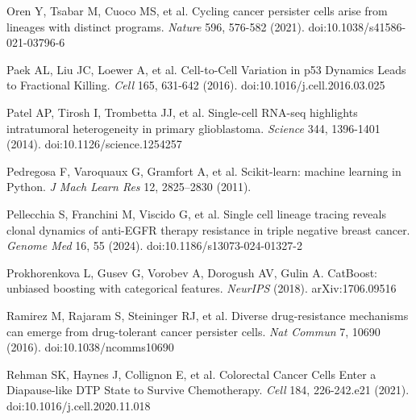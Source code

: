\documentclass[11pt,a4paper]{article}
\begin{document}
\noindent Oren Y, Tsabar M, Cuoco MS, et al. Cycling cancer persister cells arise from lineages with distinct programs. \emph{Nature} 596, 576-582 (2021). doi:10.1038/s41586-021-03796-6 \par\vspace{2pt}

\noindent Paek AL, Liu JC, Loewer A, et al. Cell-to-Cell Variation in p53 Dynamics Leads to Fractional Killing. \emph{Cell} 165, 631-642 (2016). doi:10.1016/j.cell.2016.03.025 \par\vspace{2pt}

\noindent Patel AP, Tirosh I, Trombetta JJ, et al. Single-cell RNA-seq highlights intratumoral heterogeneity in primary glioblastoma. \emph{Science} 344, 1396-1401 (2014). doi:10.1126/science.1254257 \par\vspace{2pt}

\noindent Pedregosa F, Varoquaux G, Gramfort A, et al. Scikit-learn: machine learning in Python. \emph{J Mach Learn Res} 12, 2825--2830 (2011).\par\vspace{2pt}

\noindent Pellecchia S, Franchini M, Viscido G, et al. Single cell lineage tracing reveals clonal dynamics of anti-EGFR therapy resistance in triple negative breast cancer. \emph{Genome Med} 16, 55 (2024). doi:10.1186/s13073-024-01327-2 \par\vspace{2pt}

\noindent Prokhorenkova L, Gusev G, Vorobev A, Dorogush AV, Gulin A. CatBoost: unbiased boosting with categorical features. \emph{NeurIPS} (2018). arXiv:1706.09516\par\vspace{2pt}

\noindent Ramirez M, Rajaram S, Steininger RJ, et al. Diverse drug-resistance mechanisms can emerge from drug-tolerant cancer persister cells. \emph{Nat Commun} 7, 10690 (2016). doi:10.1038/ncomms10690 \par\vspace{2pt}

\noindent Rehman SK, Haynes J, Collignon E, et al. Colorectal Cancer Cells Enter a Diapause-like DTP State to Survive Chemotherapy. \emph{Cell} 184, 226-242.e21 (2021). doi:10.1016/j.cell.2020.11.018 \par\vspace{2pt}
\end{document}

